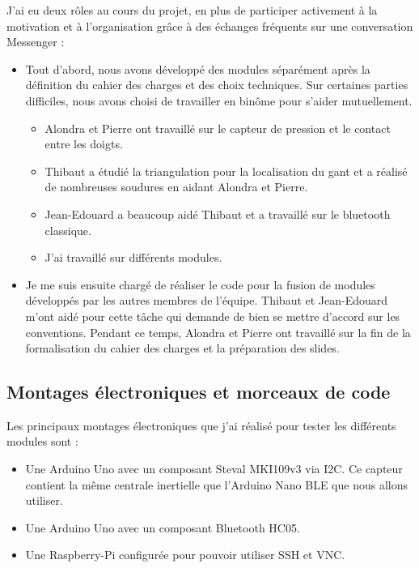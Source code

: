 \documentclass{article}
\begin{document}
        J'ai eu deux rôles au cours du projet, en plus de participer activement à la motivation et à l'organisation grâce à des 
            échanges fréquents sur une conversation Messenger :
            \begin{itemize}
                \item Tout d'abord, nous avons développé des modules séparément après la définition du cahier des charges et des choix techniques.
                        Sur certaines parties difficiles, nous avons choisi de travailler en binôme pour s'aider mutuellement.
                        \begin{itemize}
                            \item Alondra et Pierre ont travaillé sur le capteur de pression et le contact entre les doigts.
                            \item Thibaut a étudié la triangulation pour la localisation du gant et a réalisé de nombreuses soudures
                                    en aidant Alondra et Pierre.
                            \item Jean-Edouard a beaucoup aidé Thibaut et a travaillé sur le bluetooth classique.
                            \item J'ai travaillé sur différents modules.
                        \end{itemize} 
                \item Je me suis ensuite chargé de réaliser le code pour la fusion de modules développés par les autres membres de l'équipe.
                        Thibaut et Jean-Edouard m'ont aidé pour cette tâche qui demande de bien se mettre d'accord sur les conventions.
                        Pendant ce temps, Alondra et Pierre ont travaillé sur la fin de la formalisation du cahier des charges
                            et la préparation des slides.
            \end{itemize}
               
        \subsection{Montages électroniques et morceaux de code}

            Les principaux montages électroniques que j'ai réalisé pour tester les différents modules sont :

            \begin{itemize}
                \item Une Arduino Uno avec un composant Steval MKI109v3 via I2C.
                    Ce capteur contient la même centrale inertielle que l'Arduino Nano BLE que nous allons utiliser.
                \item Une Arduino Uno avec un composant Bluetooth HC05.
                \item Une Raspberry-Pi configurée pour pouvoir utiliser SSH et VNC.
            \end{itemize}
\end{document}
